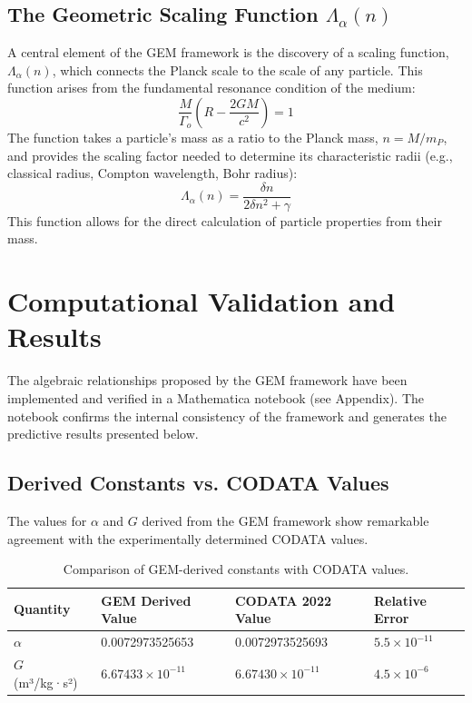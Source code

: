 \documentclass[12pt]{article}
\begin{document}
\subsection{The Geometric Scaling Function $\Lambda_\alpha(n)$}

A central element of the GEM framework is the discovery of a scaling function, $\Lambda_\alpha(n)$, which connects the Planck scale to the scale of any particle. This function arises from the fundamental resonance condition of the medium:
\begin{equation}
\frac{M}{\Gamma_o} \left(R - \frac{2GM}{c^2}\right) = 1
\end{equation}
The function takes a particle's mass as a ratio to the Planck mass, $n = M/m_P$, and provides the scaling factor needed to determine its characteristic radii (e.g., classical radius, Compton wavelength, Bohr radius):
\begin{equation}
\Lambda_\alpha(n) = \frac{\delta n}{2\delta n^2 + \gamma}
\end{equation}
This function allows for the direct calculation of particle properties from their mass.

\section{Computational Validation and Results}

The algebraic relationships proposed by the GEM framework have been implemented and verified in a Mathematica notebook (see Appendix). The notebook confirms the internal consistency of the framework and generates the predictive results presented below.

\subsection{Derived Constants vs. CODATA Values}

The values for $\alpha$ and $G$ derived from the GEM framework show remarkable agreement with the experimentally determined CODATA values.

\begin{table}[h!]
\centering
\begin{tabular}{|l|l|l|l|}
\hline
\textbf{Quantity} & \textbf{GEM Derived Value} & \textbf{CODATA 2022 Value} & \textbf{Relative Error} \\
\hline
$\alpha$ & 0.0072973525653 & 0.0072973525693 & $5.5 \times 10^{-11}$ \\
$G$ (m³/kg·s²) & $6.67433 \times 10^{-11}$ & $6.67430 \times 10^{-11}$ & $4.5 \times 10^{-6}$ \\
\hline
\end{tabular}
\caption{Comparison of GEM-derived constants with CODATA values.}
\label{tab:constants}
\end{table}
\end{document}
